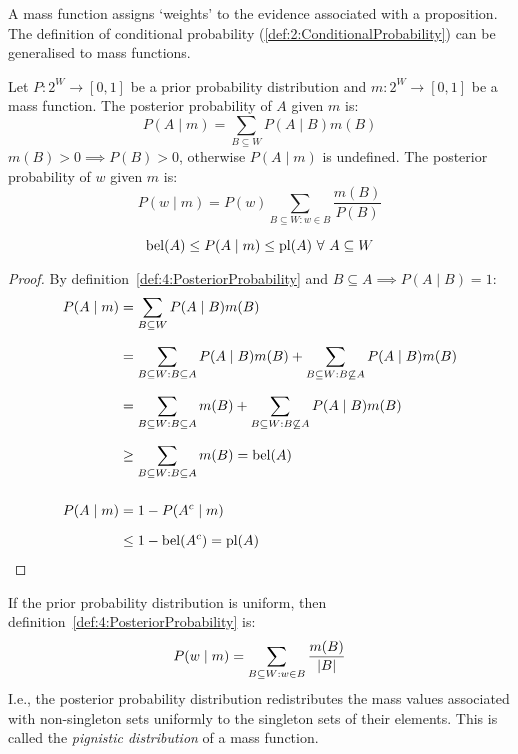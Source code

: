 A mass function assigns `weights' to the evidence associated with a proposition.
The definition of conditional probability (\ref{def:2:ConditionalProbability})
can be generalised to mass functions.

\begin{dfn}
  \label{def:4:PosteriorProbability}
  Let $P : 2^W \rightarrow [0, 1]$ be a prior probability distribution and
  $m : 2^W \rightarrow [0, 1]$ be a mass function.
  The posterior probability of $A$ given $m$ is:
  \begin{equation}
    P(A \mid m) = \sum_{B \subseteq W} P(A \mid B) m(B)
  \end{equation}
  $m(B) > 0 \implies P(B) > 0$, otherwise $P(A \mid m)$ is undefined.
  The posterior probability of $w$ given $m$ is:
  \begin{equation}
    P(w \mid m) = P(w) \sum_{B \subseteq W : w \in B} \frac{m(B)}{P(B)}
  \end{equation}
\end{dfn}

\begin{thm}
  \begin{equation}
    \bel(A) \leq P(A \mid m) \leq \pl(A) \ \forall\ A \subseteq W
  \end{equation}
  \begin{proof}
    By definition~\ref{def:4:PosteriorProbability} and
    $B \subseteq A \implies P(A \mid B) = 1$:
    \begin{align*}
      P(A \mid m)
       & = \sum_{B \subseteq W} P(A \mid B) m(B)                  \\[1.5ex]
       & = \sum_{B \subseteq W : B \subseteq A} P(A \mid B) m(B)
      + \sum_{B \subseteq W : B \not\subseteq A} P(A \mid B) m(B) \\[1.5ex]
       & = \sum_{B \subseteq W : B \subseteq A} m(B)
      + \sum_{B \subseteq W : B \not\subseteq A} P(A \mid B) m(B) \\[1.5ex]
       & \geq \sum_{B \subseteq W : B \subseteq A} m(B) = \operatorname*{bel}(A) \\[3ex]
      P(A \mid m)
       & = 1 - P(A^c \mid m)                                      \\[1.5ex]
       & \leq 1 - \operatorname*{bel}(A^c) = \operatorname*{pl}(A)
    \end{align*}
  \end{proof}
\end{thm}

If the prior probability distribution is uniform, then
definition~\ref{def:4:PosteriorProbability} is:
\begin{equation*}
  P(w \mid m) = \sum_{B \subseteq W : w \in B} \frac{m(B)}{|B|}
\end{equation*}
I.e., the posterior probability distribution redistributes the mass values
associated with non-singleton sets uniformly to the singleton sets of their
elements.
This is called the \textit{pignistic distribution} of a mass function.